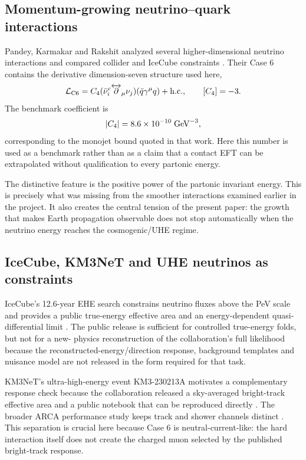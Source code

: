 \documentclass[11pt,a4paper]{article}
\begin{document}
\subsection{Momentum-growing neutrino--quark interactions}
Pandey, Karmakar and Rakshit analyzed several higher-dimensional neutrino
interactions and compared collider and IceCube constraints \cite{Pandey:2019}.
Their Case 6 contains the derivative dimension-seven structure used here,
\begin{equation}
 {\cal L}_{\rm C6}=C_4
 (\bar\nu_i^c\overleftrightarrow{\partial}_\mu\nu_j)
 (\bar q\gamma^\mu q)+{\rm h.c.},
 \qquad [C_4]=-3.
 \label{eq:C6}
\end{equation}
The benchmark coefficient is
\begin{equation}
 |C_4|=8.6\times10^{-10}\;{\rm GeV}^{-3},
 \label{eq:C4}
\end{equation}
corresponding to the monojet bound quoted in that work.  Here this number is
used as a benchmark rather than as a claim that a contact EFT can be
extrapolated without qualification to every partonic energy.

The distinctive feature is the positive power of the partonic invariant
energy.  This is precisely what was missing from the smoother interactions
examined earlier in the project.  It also creates the central tension of the
present paper: the growth that makes Earth propagation observable does not
stop automatically when the neutrino energy reaches the cosmogenic/UHE
regime.

\subsection{IceCube, KM3NeT and UHE neutrinos as constraints}
IceCube's 12.6-year EHE search constrains neutrino fluxes above the PeV scale
and provides a public true-energy effective area and an energy-dependent
quasi-differential limit \cite{IceCube:2025EHE,IceCube:2025Data}.  The public
release is sufficient for controlled true-energy folds, but not for a new-
physics reconstruction of the collaboration's full likelihood because the
reconstructed-energy/direction response, background templates and nuisance
model are not released in the form required for that task.

KM3NeT's ultra-high-energy event KM3-230213A motivates a complementary
response check because the collaboration released a sky-averaged bright-track
effective area and a public notebook that can be reproduced directly
\cite{KM3NeT:2025Nature,KM3NeT:2025Data}.  The broader ARCA performance study
keeps track and shower channels distinct \cite{KM3NeT:2024ARCA}.  This
separation is crucial here because Case 6 is neutral-current-like: the hard
interaction itself does not create the charged muon selected by the published
bright-track response.
\end{document}
